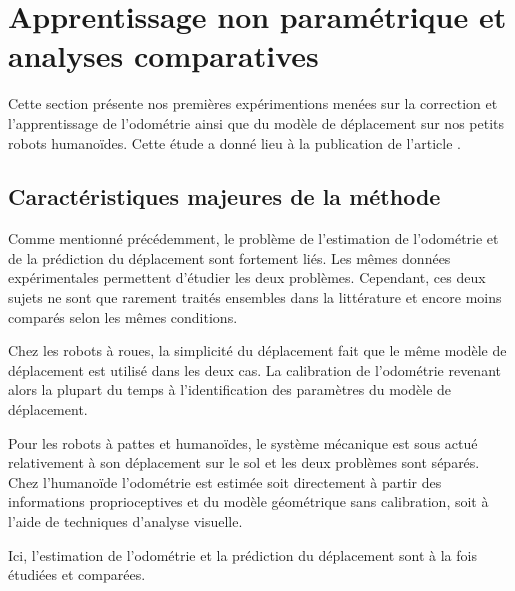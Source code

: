 
\section{Apprentissage non paramétrique et analyses comparatives\label{sec:odometry_lwpr}}

Cette section présente nos premières expérimentions menées
sur la correction et l'apprentissage de l'odométrie ainsi que 
du modèle de déplacement sur nos petits robots humanoïdes.
Cette étude a donné lieu à la publication de l'article 
\cite{OdometryICRA2016}.

\subsection{Caractéristiques majeures de la méthode}

Comme mentionné précédemment, le problème de l'estimation
de l'odométrie et de la prédiction du déplacement sont fortement liés.
Les mêmes données expérimentales permettent d'étudier les deux problèmes.
Cependant, ces deux sujets ne sont que rarement traités ensembles dans 
la littérature et encore moins comparés selon les mêmes conditions.

Chez les robots à roues, la simplicité du déplacement fait que le
même modèle de déplacement est utilisé dans les deux cas.
La calibration de l'odométrie revenant alors la plupart du temps 
à l'identification des paramètres du modèle de déplacement.

Pour les robots à pattes et humanoïdes, le système mécanique 
est sous actué relativement à son déplacement sur le sol et 
les deux problèmes sont séparés.
Chez l'humanoïde l'odométrie est estimée soit directement à partir des informations
proprioceptives et du modèle géométrique sans calibration, soit à l'aide 
de techniques d'analyse visuelle.

Ici, l'estimation de l'odométrie et la prédiction du déplacement sont
à la fois étudiées et comparées.

